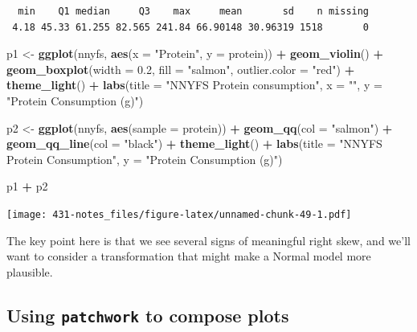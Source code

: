 \documentclass[
]{book}
\newenvironment{Shaded}{\begin{snugshade}}{\end{snugshade}}
\newcommand{\DataTypeTok}[1]{\textcolor[rgb]{0.13,0.29,0.53}{#1}}
\newcommand{\FloatTok}[1]{\textcolor[rgb]{0.00,0.00,0.81}{#1}}
\newcommand{\KeywordTok}[1]{\textcolor[rgb]{0.13,0.29,0.53}{\textbf{#1}}}
\newcommand{\NormalTok}[1]{#1}
\newcommand{\OperatorTok}[1]{\textcolor[rgb]{0.81,0.36,0.00}{\textbf{#1}}}
\newcommand{\StringTok}[1]{\textcolor[rgb]{0.31,0.60,0.02}{#1}}
\begin{document}
\begin{verbatim}
  min    Q1 median     Q3    max     mean       sd    n missing
 4.18 45.33 61.255 82.565 241.84 66.90148 30.96319 1518       0
\end{verbatim}

\begin{Shaded}
\begin{Highlighting}[]
\NormalTok{p1 <-}\StringTok{ }\KeywordTok{ggplot}\NormalTok{(nnyfs, }\KeywordTok{aes}\NormalTok{(}\DataTypeTok{x =} \StringTok{"Protein"}\NormalTok{, }\DataTypeTok{y =}\NormalTok{ protein)) }\OperatorTok{+}
\StringTok{    }\KeywordTok{geom_violin}\NormalTok{() }\OperatorTok{+}
\StringTok{    }\KeywordTok{geom_boxplot}\NormalTok{(}\DataTypeTok{width =} \FloatTok{0.2}\NormalTok{, }\DataTypeTok{fill =} \StringTok{"salmon"}\NormalTok{, }
                 \DataTypeTok{outlier.color =} \StringTok{"red"}\NormalTok{) }\OperatorTok{+}
\StringTok{    }\KeywordTok{theme_light}\NormalTok{() }\OperatorTok{+}
\StringTok{    }\KeywordTok{labs}\NormalTok{(}\DataTypeTok{title =} \StringTok{"NNYFS Protein consumption"}\NormalTok{,}
         \DataTypeTok{x =} \StringTok{""}\NormalTok{, }\DataTypeTok{y =} \StringTok{"Protein Consumption (g)"}\NormalTok{)}

\NormalTok{p2 <-}\StringTok{ }\KeywordTok{ggplot}\NormalTok{(nnyfs, }\KeywordTok{aes}\NormalTok{(}\DataTypeTok{sample =}\NormalTok{ protein)) }\OperatorTok{+}
\StringTok{    }\KeywordTok{geom_qq}\NormalTok{(}\DataTypeTok{col =} \StringTok{"salmon"}\NormalTok{) }\OperatorTok{+}\StringTok{ }
\StringTok{    }\KeywordTok{geom_qq_line}\NormalTok{(}\DataTypeTok{col =} \StringTok{"black"}\NormalTok{) }\OperatorTok{+}
\StringTok{    }\KeywordTok{theme_light}\NormalTok{() }\OperatorTok{+}
\StringTok{    }\KeywordTok{labs}\NormalTok{(}\DataTypeTok{title =} \StringTok{"NNYFS Protein Consumption"}\NormalTok{,}
         \DataTypeTok{y =} \StringTok{"Protein Consumption (g)"}\NormalTok{)}

\NormalTok{p1 }\OperatorTok{+}\StringTok{ }\NormalTok{p2}
\end{Highlighting}
\end{Shaded}

\texttt{[image: 431-notes\_files/figure-latex/unnamed-chunk-49-1.pdf]}

The key point here is that we see several signs of meaningful right skew, and we'll want to consider a transformation that might make a Normal model more plausible.

\hypertarget{using-patchwork-to-compose-plots}{%
\subsection{\texorpdfstring{Using \texttt{patchwork} to compose plots}{Using patchwork to compose plots}}\label{using-patchwork-to-compose-plots}}
\end{document}
